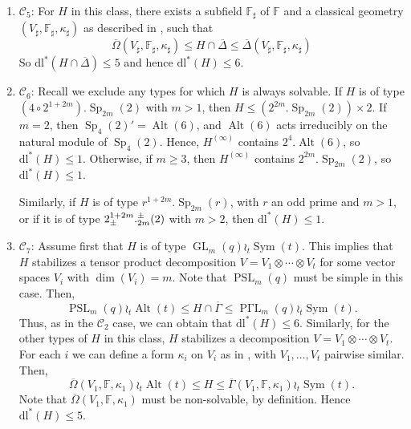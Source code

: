\documentclass[11pt]{amsart}
\numberwithin{equation}{section}
\theoremstyle{definition}
\theoremstyle{remark}
\newcommand{\Sym}{\mathop{\mathrm{Sym}}}
\newcommand{\Alt}{\mathop{\mathrm{Alt}}}
\DeclareMathOperator{\GL}{GL}
\newcommand{\dll}{\mathrm{dl^*}}
\DeclareMathOperator{\PGammaL}{P \Gamma L}
\DeclareMathOperator{\PSL}{PSL}
\DeclareMathOperator{\GU}{GU}
\DeclareMathOperator{\Sp}{Sp}
\let\O\relax
\DeclareMathOperator{\O}{O}
\begin{document}
\begin{enumerate}
    If $H$ is instead of type $\GU_{n_1}(q) \otimes \GU_{n_2}(q)$, $\Sp_{n_1}(q) \otimes \O_{n_2}^\epsilon (q)$, $\Sp_{n_1}(q) \otimes \Sp_{n_2} (q)$ or $\O_{n_1}^{\epsilon_1}(q) \otimes \O_{n_2}^{\epsilon_2} (q)$, then $H$ stabilizes a vector space decomposition $V=V_1 \otimes V_2$ for some vector spaces $V_1, V_2$ with forms $\kappa_i$ on each $V_i$. Thus,
    \[
        \overline \Omega(V_1, \mathbb F, \kappa_1) \times \overline \Omega(V_2, \mathbb F, \kappa_2) 
        \leqslant H \leqslant
        \overline \Gamma(V_1, \mathbb F, \kappa_1) \times \overline \Gamma(V_2, \mathbb F, \kappa_2).
    \]
    We hence obtain that $\dll(H) \leq 6$, as before.
    
    \item $\mathscr C_5$: For $H$ in this class, there exists a subfield $\mathbb F_\sharp$ of $\mathbb F$ and a classical geometry $(V_\sharp, \mathbb{F}_\sharp, \kappa_\sharp)$ as described in \cite[Sec.~4.5]{KL90}, such that
    \[
        \overline \Omega(V_\sharp, \mathbb{F}_\sharp, \kappa_\sharp) 
        \leqslant H \cap \overline \Delta \leqslant
        \overline \Delta(V_\sharp, \mathbb{F}_\sharp, \kappa_\sharp)
    \]
    So $\dll(H \cap \overline \Delta) \leq 5$ and hence $\dll(H) \leq 6$.
    
    \item $\mathscr C_6$: Recall we exclude any types for which $H$ is always solvable. If $H$ is of type $(4 \circ 2 ^{1+2m}). \Sp_{2m}(2)$ with $m > 1$, then $H \leqslant (2^{2m} . \Sp_{2m}(2)) \times 2$. If $m=2$, then $\Sp_4(2)' = \Alt(6)$, and $\Alt(6)$ acts irreducibly on the natural module of $\Sp_4(2)$. Hence, $H^{(\infty)}$ contains $2^4.\Alt(6)$, so $\dll(H) \leq 1$. Otherwise, if $m \geq 3$, then $H^{(\infty)}$ contains $2^{2m}.\Sp_{2m}(2)$, so $\dll(H) \leq 1$. 
    
    Similarly, if $H$ is of type $r^{1+2m}.\Sp_{2m}(r)$, with $r$ an odd prime and $m > 1$, or if it is of type $2_\pm^{1+2m}.\O_{2m}^\pm(2)$ with $m > 2$, then $\dll(H) \leq 1$. 
    
    \item $\mathscr C_7$: Assume first that $H$ is of type $\GL_m(q) \wr_t \Sym(t)$. This implies that $H$ stabilizes a tensor product decomposition $V = V_1 \otimes \cdots \otimes V_t$ for some vector spaces $V_i$ with $\dim(V_i) = m$. Note that $\PSL_m(q)$ must be simple in this case. Then, 
    \[
        \PSL_m(q) \wr_t \Alt(t) 
        \leqslant H \cap \overline \Gamma \leqslant
        \PGammaL_m(q) \wr_t \Sym(t).
    \]
    Thus, as in the $\mathscr C_2$ case, we can obtain that $\dll(H) \leq 6$. Similarly, for the other types of $H$ in this class, $H$ stabilizes a decomposition $V=V_1 \otimes \cdots \otimes V_t$. For each $i$ we can define a form $\kappa_i$ on $V_i$ as in \cite[Section 4.7]{KL90}, with $V_1, \dots, V_t$ pairwise similar. Then,
    \[
        \overline \Omega(V_1, \mathbb F, \kappa_1) \wr_t \Alt(t) 
        \leqslant H \leqslant
        \overline \Gamma(V_1, \mathbb F, \kappa_1) \wr_t \Sym(t).
    \]
    Note that $\overline \Omega(V_1, \mathbb F, \kappa_1)$ must be non-solvable, by definition. Hence $\dll(H) \leq 5$.
    

\end{enumerate}
\end{document}
